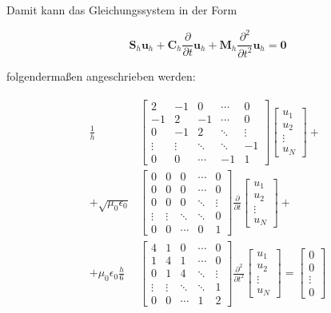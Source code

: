 	Damit kann das Gleichungssystem in der Form
	
	\begin{equation}
	\mathbf{S}_h \mathbf{u}_h + \mathbf{C}_h \frac{\partial}{\partial t} \mathbf{u}_h + \mathbf{M}_h \frac{\partial ^2}{\partial t^2} \mathbf{u}_h = \mathbf{0}
	\end{equation}
	
	folgendermaßen angeschrieben werden:
	
	\begin{align}
	\begin{split}
	\frac{1}{h}   
	&\begin{bmatrix}
	2 & -1 & 0 & \cdots & 0 \\ 
	-1 & 2 & -1 & \cdots & 0 \\ 
	0 & -1 & 2 & \ddots & \vdots \\ 
	\vdots & \vdots & \ddots & \ddots & -1 \\ 
	0 & 0 & \cdots & -1 & 1
	\end{bmatrix} 
	\begin{bmatrix}
	u_1 \\ 
	u_2 \\ 
	\vdots \\ 
	u_N
	\end{bmatrix}  +
	\\
	+
	\sqrt{\mu_0 \epsilon_0} 
	&\begin{bmatrix}
	0 & 0 & 0 & \cdots & 0 \\ 
	0 & 0 & 0 & \cdots & 0 \\ 
	0 & 0 & 0 & \ddots & \vdots \\ 
	\vdots & \vdots & \ddots & \ddots & 0 \\ 
	0 & 0 & \cdots & 0 & 1
	\end{bmatrix} 
	\frac{\partial}{\partial t} 
	\begin{bmatrix}
	u_1 \\ 
	u_2 \\ 
	\vdots \\ 
	u_N
	\end{bmatrix}
	+ \\ +
	\mu_0 \epsilon_0 \frac{h}{6}
	&\begin{bmatrix}
	4 & 1 & 0 & \cdots & 0 \\ 
	1 & 4 & 1 & \cdots & 0 \\ 
	0 & 1 & 4 & \ddots & \vdots \\ 
	\vdots & \vdots & \ddots & \ddots & 1 \\ 
	0 & 0 & \cdots & 1 & 2
	\end{bmatrix} 
	\frac{\partial ^2}{\partial t^2} 
	\begin{bmatrix}
	u_1 \\ 
	u_2 \\ 
	\vdots \\ 
	u_N
	\end{bmatrix} = 
	\begin{bmatrix}
	0 \\ 
	0 \\ 
	\vdots \\ 
	0
	\end{bmatrix}
	\end{split}
	\end{align}
	
